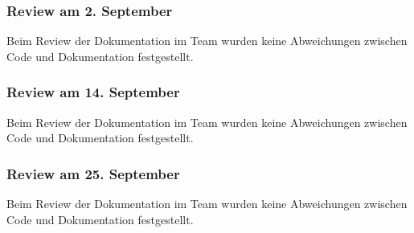 \subsubsection{Review am 2. September}

Beim Review der Dokumentation im Team wurden keine Abweichungen zwischen Code und Dokumentation festgestellt.


\subsubsection{Review am 14. September}

Beim Review der Dokumentation im Team wurden keine Abweichungen zwischen Code und Dokumentation festgestellt.


\subsubsection{Review am 25. September}

Beim Review der Dokumentation im Team wurden keine Abweichungen zwischen Code und Dokumentation festgestellt.




